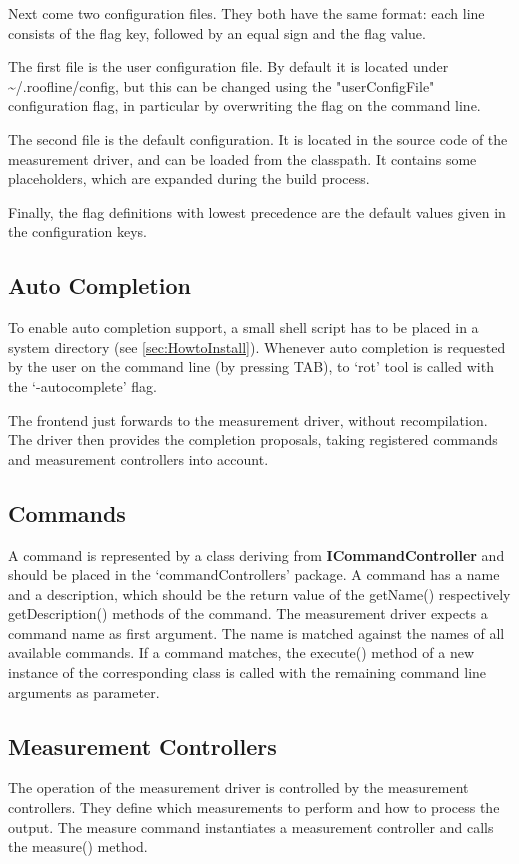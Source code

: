 \documentclass[a4paper,12pt]{report}
\newcommand{\class}[1]{\textbf{#1}}
\newcommand{\method}[1]{\textsf{#1}}
\begin{document}
Next come two configuration files. They both have the same format: each line
consists of the flag key, followed by an equal sign and the flag value. 

The first file is the user configuration file. By default it is located under
\textasciitilde/.roofline/config, but this can be changed using the
"userConfigFile" configuration flag, in particular by overwriting the flag on
the command line.

The second file is the default configuration. It is located in the source code
of the measurement driver, and can be loaded from the classpath. It contains
some placeholders, which are expanded during the build process.

Finally, the flag definitions with lowest precedence are the default values
given in the configuration keys.

\subsection{Auto Completion}
To enable auto completion support, a small shell script has to be placed in a
system directory (see \ref{sec:HowtoInstall}). Whenever auto completion is
requested by the user on the command line (by pressing TAB), to `rot' tool is
called with the `-autocomplete' flag. 

The frontend just forwards to the measurement driver, without recompilation. The
driver then provides the completion proposals, taking registered commands and
measurement controllers into account.

\subsection{Commands}
A command is represented by a class deriving from \class{ICommandController} and
should be placed in the `commandControllers' package. A command has a name and a
description, which should be the return value of the \method{getName()}
respectively \method{getDescription()} methods of the command. The measurement
driver expects a command name as first argument. The name is matched against the
names of all available commands. If a command matches, the \method{execute()}
method of a new instance of the corresponding class is called with the remaining command
line arguments as parameter.

\subsection{Measurement Controllers}
The operation of the measurement driver is controlled by the measurement
controllers. They define which measurements to perform and how to process the
output. The measure command instantiates a measurement controller and calls the
\method{measure()} method.
\end{document}

